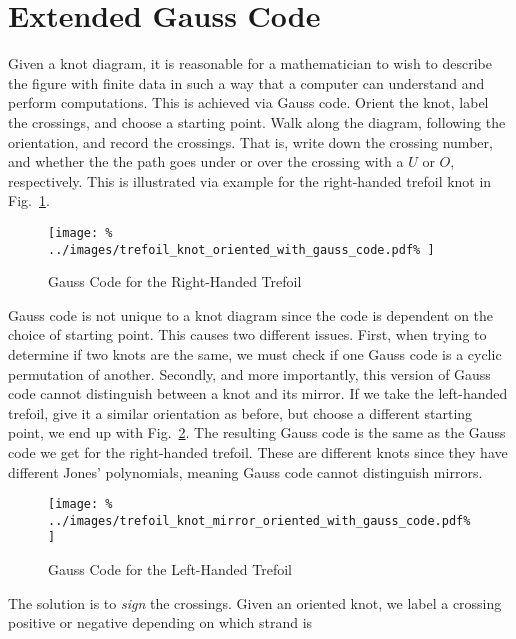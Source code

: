 \documentclass{article}
\theoremstyle{plain}
\begin{document}
    \section{Extended Gauss Code}
        Given a knot diagram, it is reasonable for a mathematician to wish to
        describe the figure with finite data in such a way that a computer can
        understand and perform computations. This is achieved via Gauss code.
        Orient the knot, label the crossings, and choose a starting point.
        Walk along the diagram, following the orientation, and record the
        crossings. That is, write down the crossing number, and whether the
        the path goes under or over the crossing with a $U$ or $O$,
        respectively. This is illustrated via example for the right-handed
        trefoil knot in Fig.~\ref{fig:right_handed_trefoil_gauss_code}.
        \begin{figure}
            \centering
            \texttt{[image: \%
                ../images/trefoil\_knot\_oriented\_with\_gauss\_code.pdf\%
            ]}
            \caption{Gauss Code for the Right-Handed Trefoil}
            \label{fig:right_handed_trefoil_gauss_code}
        \end{figure}
        Gauss code is not unique to a knot diagram since the code is dependent
        on the choice of starting point. This causes two different issues.
        First, when trying to determine if two knots are the same, we must
        check if one Gauss code is a cyclic permutation of another. Secondly,
        and more importantly, this version of Gauss code cannot distinguish
        between a knot and its mirror. If we take the left-handed trefoil,
        give it a similar orientation as before, but choose a different
        starting point, we end up with
        Fig.~\ref{fig:left_handed_trefoil_gauss_code}. The resulting Gauss code
        is the same as the Gauss code we get for the right-handed trefoil.
        These are different knots since they have different Jones' polynomials,
        meaning Gauss code cannot distinguish mirrors.
        \begin{figure}
            \centering
            \texttt{[image: \%
                ../images/trefoil\_knot\_mirror\_oriented\_with\_gauss\_code.pdf\%
            ]}
            \caption{Gauss Code for the Left-Handed Trefoil}
            \label{fig:left_handed_trefoil_gauss_code}
        \end{figure}
        The solution is to \textit{sign} the crossings. Given an oriented knot,
        we label a crossing positive or negative depending on which strand is
\end{document}
